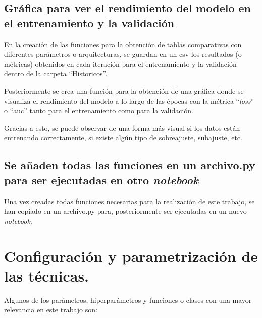 \subsection{Gráfica para ver el rendimiento del modelo en el entrenamiento y la validación}

En la creación de las funciones para la obtención de tablas comparativas con diferentes parámetros o arquitecturas, se guardan en un csv los resultados (o métricas) obtenidos en cada iteración para el entrenamiento y la validación dentro de la carpeta ``Historicos''. 

Posteriormente se crea una función para la obtención de una gráfica donde se visualiza el rendimiento del modelo a lo largo de las épocas con la métrica ``\textit{loss}'' o ``auc'' tanto para el entrenamiento como para la validación.

Gracias a esto, se puede observar de una forma más visual si los datos están entrenando correctamente, si existe algún tipo de sobreajuste, subajuste, etc.

\subsection{Se añaden todas las funciones en un archivo.py para ser ejecutadas en otro \textit{notebook}}

Una vez creadas todas funciones necesarias para la realización de este trabajo, se han copiado en un archivo.py para, posteriormente ser ejecutadas en un nuevo \textit{notebook}.

\section{Configuración y parametrización de las técnicas.}

Algunos de los parámetros, hiperparámetros y funciones o clases con una mayor relevancia en este trabajo son:

